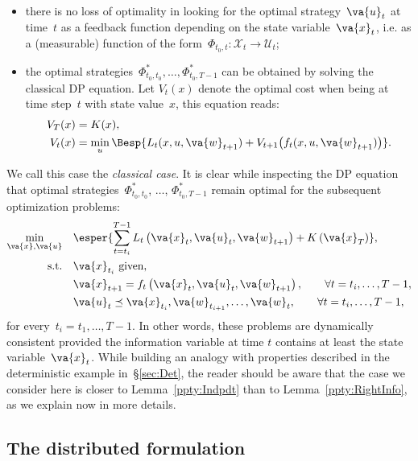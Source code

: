 \documentclass[a4paper]{amsart}
\theoremstyle{plain}
\theoremstyle{definition}
\theoremstyle{remark}
\begin{document}
\begin{itemize}
    \item there is no loss of optimality in looking for the optimal
        strategy~$\va{u}_t$ at time~$t$ as a feedback function depending
        on the state variable~$\va{x}_t$, i.e. as a (measurable) function of
        the form~$\Phi_{t_0, t}: \mathcal{X}_t \rightarrow \mathcal{U}_t$;
    \item the optimal strategies~$\Phi_{t_0, t_0}^*, \dots, \Phi_{t_0,
        T-1}^*$ can be obtained by solving the classical DP equation. Let
        $V_t(x)$ denote the optimal cost when being at time step~$t$ with state
        value~$x$, this equation reads:
        \begin{align*}
            V_{T}(x) & = K(x), \\
            V_{t}(x) & = \min_{u} \Besp{L_{t}(x,u,\va{w}_{t+1}) + V_{t+1}\big(
            f_{t}(x,u,\va{w}_{t+1}) \big)}.
        \end{align*}
\end{itemize}
We call this case the \emph{classical case}. It is clear while
inspecting the DP equation that optimal strategies~$\Phi_{t_0,
t_0}^*$, $\dots$, $\Phi_{t_0, T-1}^*$ remain optimal for the
subsequent optimization problems:
\begin{subequations} \label{eqn:PbDyn}
\begin{align}
\min_{\va{x}, \va{u}} \quad& \esper{\sum_{t=t_i}^{T-1}
L_t\left(\va{x}_t, \va{u}_t, \va{w}_{t+1}\right) +
K\left(\va{x}_T\right)}, \\
\text{s.t.} \quad& \va{x}_{t_i} \text{ given}, \\
& \va{x}_{t+1} = f_t\left(\va{x}_t, \va{u}_t, \va{w}_{t+1}\right),
\qquad \forall t=t_i, \dots, T-1, \\
& \va{u}_t \preceq \va{x}_{t_i}, \va{w}_{t_{i+1}}, \dots,
\va{w}_t, \qquad \forall t = t_i, \dots, T-1,
\end{align}
\end{subequations}
for every~$t_i=t_1, \dots, T-1$. In other words, these problems
are dynamically consistent provided the information variable at
time $t$ contains at least the state variable~$\va{x}_{t}$. While
building an analogy with properties described in the deterministic
example in~\S\ref{sec:Det}, the reader should be aware that the
case we consider here is closer to Lemma~\ref{ppty:Indpdt} than to
Lemma~\ref{ppty:RightInfo}, as we explain now in more details.

\subsection{The distributed formulation}
\end{document}

